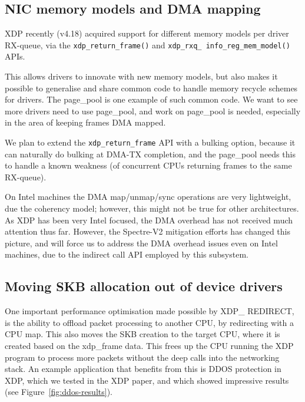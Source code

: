 \documentclass[sigconf]{acmart}
\begin{document}
\subsection{NIC memory models and DMA mapping}
\label{sec:nic-memory-models}

XDP recently (v4.18) acquired support for different memory models per driver
RX-queue, via the \texttt{xdp\_return\_frame()} and
\texttt{xdp\_rxq\_ info\_reg\_mem\_model()} APIs.

This allows drivers to innovate with new memory models, but also makes it
possible to generalise and share common code to handle memory recycle schemes
for drivers. The page\_pool is one example of such common code. We want to see
more drivers need to use page\_pool, and work on page\_pool is needed, especially
in the area of keeping frames DMA mapped.

We plan to extend the \texttt{xdp\_return\_frame} API with a bulking option,
because it can naturally do bulking at DMA-TX completion, and the page\_pool
needs this to handle a known weakness (of concurrent CPUs returning frames to
the same RX-queue).

On Intel machines the DMA map/unmap/sync operations are very lightweight, due
the coherency model; however, this might not be true for other architectures. As
XDP has been very Intel focused, the DMA overhead has not received much
attention thus far. However, the Spectre-V2 mitigation efforts has changed this
picture, and will force us to address the DMA overhead issues even on Intel
machines, due to the indirect call API employed by this subsystem.

\subsection{Moving SKB allocation out of device drivers}
\label{sec:moving-skb-alloc}

One important performance optimisation made possible by XDP\_ REDIRECT, is the
ability to offload packet processing to another CPU, by redirecting with a CPU
map. This also moves the SKB creation to the target CPU, where it is created
based on the xdp\_frame data. This frees up the CPU running the XDP program to
process more packets without the deep calls into the networking stack. An
example application that benefits from this is DDOS protection in XDP, which we
tested in the XDP paper, and which showed impressive results (see
Figure~\ref{fig:ddos-results}).
\end{document}
